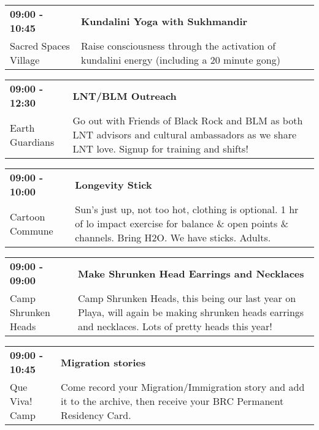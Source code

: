 \begin{tabular}{ p{1in} p{2.2in} }
    \textbf{09:00 - 10:45} & \textbf{Kundalini Yoga with Sukhmandir} \\
    Sacred Spaces Village \newline  & Raise consciousness through the activation of kundalini energy (including a 20 minute gong) \\
    \hline 
\end{tabular}
    
\begin{tabular}{ p{1in} p{2.2in} }
    \textbf{09:00 - 12:30} & \textbf{LNT/BLM Outreach } \\
    Earth Guardians \newline  & Go out with Friends of Black Rock and BLM as both LNT advisors and cultural ambassadors as we share LNT love. Signup for training and shifts! \\
    \hline 
\end{tabular}
    
\begin{tabular}{ p{1in} p{2.2in} }
    \textbf{09:00 - 10:00} & \textbf{Longevity Stick} \\
    Cartoon Commune \newline  & Sun's just up, not too hot, clothing is optional. 1 hr of lo impact exercise for balance \& open points \& channels. Bring H2O. We have sticks. Adults. \\
    \hline 
\end{tabular}
    
\begin{tabular}{ p{1in} p{2.2in} }
    \textbf{09:00 - 09:00} & \textbf{Make Shrunken Head Earrings and Necklaces} \\
    Camp Shrunken Heads \newline  & Camp Shrunken Heads, this being our last year on Playa, will again be making shrunken heads earrings and necklaces. Lots of pretty heads this year! \\
    \hline 
\end{tabular}
    
\begin{tabular}{ p{1in} p{2.2in} }
    \textbf{09:00 - 10:45} & \textbf{Migration stories} \\
    Que Viva! Camp \newline  & Come record your Migration/Immigration story and add it to the archive, then receive your BRC Permanent Residency Card. \\
    \hline 
\end{tabular}
    

